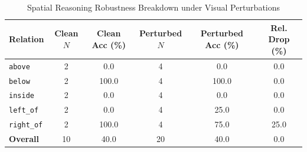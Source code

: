 \begin{table}[htbp]
\centering
\caption{Spatial Reasoning Robustness Breakdown under Visual Perturbations}
\label{tab:spatial_robustness}
\begin{tabular}{lccccc}
\toprule
Relation & Clean $N$ & Clean Acc (\%) & Perturbed $N$ & Perturbed Acc (\%) & Rel. Drop (\%) \\
\midrule
\texttt{above} & 2 & 0.0 & 4 & 0.0 & 0.0 \\
\texttt{below} & 2 & 100.0 & 4 & 100.0 & 0.0 \\
\texttt{inside} & 2 & 0.0 & 4 & 0.0 & 0.0 \\
\texttt{left\_of} & 2 & 0.0 & 4 & 25.0 & 0.0 \\
\texttt{right\_of} & 2 & 100.0 & 4 & 75.0 & 25.0 \\
\midrule
\textbf{Overall} & 10 & 40.0 & 20 & 40.0 & 0.0 \\
\bottomrule
\end{tabular}
\end{table}